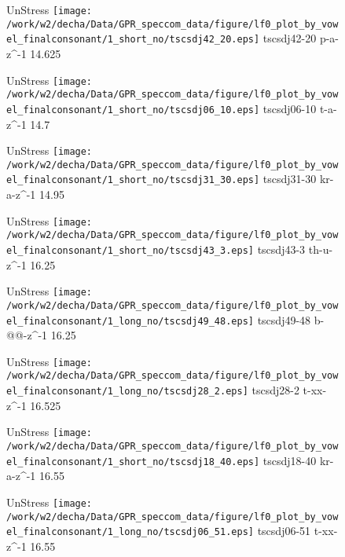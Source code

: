 \documentclass{article}
\begin{document}
\begin{figure}[t]
\begin{minipage}[b]{.24\textwidth}
UnStress
\centering
\texttt{[image: /work/w2/decha/Data/GPR\_speccom\_data/figure/lf0\_plot\_by\_vowel\_finalconsonant/1\_short\_no/tscsdj42\_20.eps]}
tscsdj42-20 p-a-z\textasciicircum-1 14.625
\end{minipage}
\begin{minipage}[b]{.24\textwidth}
UnStress
\centering
\texttt{[image: /work/w2/decha/Data/GPR\_speccom\_data/figure/lf0\_plot\_by\_vowel\_finalconsonant/1\_short\_no/tscsdj06\_10.eps]}
tscsdj06-10 t-a-z\textasciicircum-1 14.7
\end{minipage}
\begin{minipage}[b]{.24\textwidth}
UnStress
\centering
\texttt{[image: /work/w2/decha/Data/GPR\_speccom\_data/figure/lf0\_plot\_by\_vowel\_finalconsonant/1\_short\_no/tscsdj31\_30.eps]}
tscsdj31-30 kr-a-z\textasciicircum-1 14.95
\end{minipage}
\begin{minipage}[b]{.24\textwidth}
UnStress
\centering
\texttt{[image: /work/w2/decha/Data/GPR\_speccom\_data/figure/lf0\_plot\_by\_vowel\_finalconsonant/1\_short\_no/tscsdj43\_3.eps]}
tscsdj43-3 th-u-z\textasciicircum-1 16.25
\end{minipage}
\end{figure}
\clearpage
\begin{figure}[t]
\begin{minipage}[b]{.24\textwidth}
UnStress
\centering
\texttt{[image: /work/w2/decha/Data/GPR\_speccom\_data/figure/lf0\_plot\_by\_vowel\_finalconsonant/1\_long\_no/tscsdj49\_48.eps]}
tscsdj49-48 b-@@-z\textasciicircum-1 16.25
\end{minipage}
\begin{minipage}[b]{.24\textwidth}
UnStress
\centering
\texttt{[image: /work/w2/decha/Data/GPR\_speccom\_data/figure/lf0\_plot\_by\_vowel\_finalconsonant/1\_long\_no/tscsdj28\_2.eps]}
tscsdj28-2 t-xx-z\textasciicircum-1 16.525
\end{minipage}
\begin{minipage}[b]{.24\textwidth}
UnStress
\centering
\texttt{[image: /work/w2/decha/Data/GPR\_speccom\_data/figure/lf0\_plot\_by\_vowel\_finalconsonant/1\_short\_no/tscsdj18\_40.eps]}
tscsdj18-40 kr-a-z\textasciicircum-1 16.55
\end{minipage}
\begin{minipage}[b]{.24\textwidth}
UnStress
\centering
\texttt{[image: /work/w2/decha/Data/GPR\_speccom\_data/figure/lf0\_plot\_by\_vowel\_finalconsonant/1\_long\_no/tscsdj06\_51.eps]}
tscsdj06-51 t-xx-z\textasciicircum-1 16.55
\end{minipage}
\end{figure}
\end{document}
